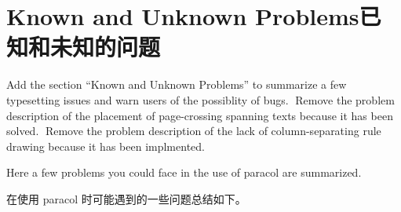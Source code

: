  \section{Known and Unknown Problems\hfill 已知和未知的问题}
 \label{sec:problem}
 	{Add the section ``Known and Unknown Problems'' to summarize a few
 	 typesetting issues and warn users of the possiblity of bugs.}
	{Remove the problem description of the placement of page-crossing
	 spanning texts because it has been solved.}
	{Remove the problem description of the lack of column-separating rule
	 drawing because it has been implmented.}
 
 Here a few problems you could face in the use of \textsf{paracol} are
 summarized.

 在使用 \textsf{paracol} 时可能遇到的一些问题总结如下。
